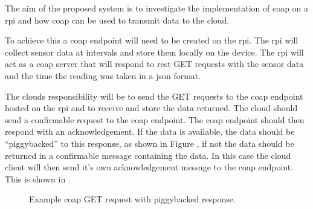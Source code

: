 The aim of the proposed system is to investigate the implementation of \gls{coap} 
on a \gls{rpi} and how \gls{coap} can be 
used to transmit data to the cloud. 

To achieve this a \gls{coap} endpoint will need to be created on the \gls{rpi}. 
The \gls{rpi} will collect sensor data at intervals and store them 
locally on the device. The \gls{rpi} will act as a \gls{coap} server that will 
respond to \gls{rest} GET requests with the sensor data and the time
the reading was taken in a \gls{json} format.

The clouds responsibility will be to send the GET requests to the \gls{coap} 
endpoint hosted on the \gls{rpi} and to receive and store the data
returned. The cloud should send a confirmable request to the \gls{coap} endpoint. 
The \gls{coap} endpoint should then respond with an acknowledgement. 
If the data is available, the data should be ``piggybacked'' to this response, as 
shown in Figure , if not the data should be 
returned in a confirmable message containing the data.
 In this case the cloud client will then send it's own acknowledgement message to 
 the \gls{coap} endpoint. This is shown in  .

\begin{figure}[H]
    \centering
    \caption{\label{fig:coap_get_piggy} Example \gls{coap} GET request with piggybacked response. \citep{shelby_constrained_2014}}
\end{figure}

